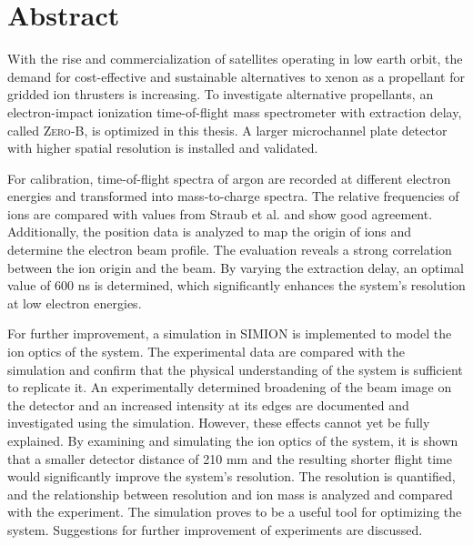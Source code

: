 \chapter*{Abstract}
With the rise and commercialization of satellites operating in low earth orbit, the demand for cost-effective and sustainable alternatives to xenon as a propellant for gridded ion thrusters is increasing. To investigate alternative propellants, an electron-impact ionization time-of-flight mass spectrometer with extraction delay, called \textsc{Zero-B}, is optimized in this thesis. A larger microchannel plate detector with higher spatial resolution is installed and validated.

For calibration, time-of-flight spectra of argon are recorded at different electron energies and transformed into mass-to-charge spectra. The relative frequencies of ions are compared with values from Straub et al. \cite{Straub} and show good agreement. Additionally, the position data is analyzed to map the origin of ions and determine the electron beam profile. The evaluation reveals a strong correlation between the ion origin and the beam. By varying the extraction delay, an optimal value of 600 ns is determined, which significantly enhances the system’s resolution at low electron energies.

For further improvement, a simulation in \textsc{SIMION} is implemented to model the ion optics of the system. The experimental data are compared with the simulation and confirm that the physical understanding of the system is sufficient to replicate it. An experimentally determined broadening of the beam image on the detector and an increased intensity at its edges are documented and investigated using the simulation. However, these effects cannot yet be fully explained. By examining and simulating the ion optics of the system, it is shown that a smaller detector distance of 210 mm and the resulting shorter flight time would significantly improve the system’s resolution. The resolution is quantified, and the relationship between resolution and ion mass is analyzed and compared with the experiment. The simulation proves to be a useful tool for optimizing the system. Suggestions for further improvement of experiments are discussed.